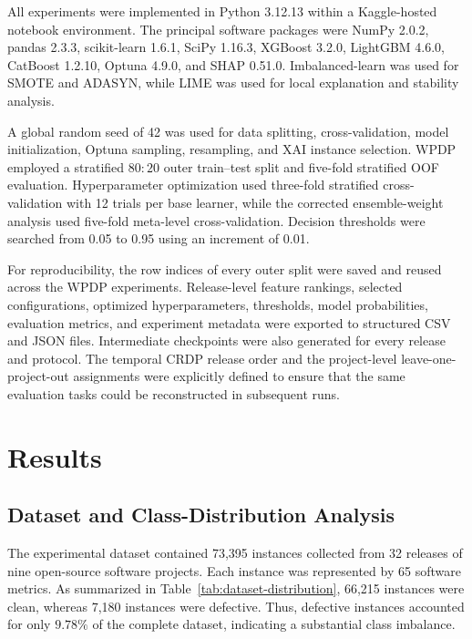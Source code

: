 \documentclass[conference]{IEEEtran}
\begin{document}
All experiments were implemented in Python 3.12.13 within a
Kaggle-hosted notebook environment. The principal software packages
were NumPy 2.0.2, pandas 2.3.3, scikit-learn 1.6.1, SciPy 1.16.3,
XGBoost 3.2.0, LightGBM 4.6.0, CatBoost 1.2.10, Optuna 4.9.0, and SHAP
0.51.0. Imbalanced-learn was used for SMOTE and ADASYN, while LIME was
used for local explanation and stability analysis.

A global random seed of 42 was used for data splitting,
cross-validation, model initialization, Optuna sampling, resampling,
and XAI instance selection. WPDP employed a stratified \(80{:}20\)
outer train--test split and five-fold stratified OOF evaluation.
Hyperparameter optimization used three-fold stratified
cross-validation with 12 trials per base learner, while the corrected
ensemble-weight analysis used five-fold meta-level cross-validation.
Decision thresholds were searched from 0.05 to 0.95 using an increment
of 0.01.

For reproducibility, the row indices of every outer split were saved and
reused across the WPDP experiments. Release-level feature rankings,
selected configurations, optimized hyperparameters, thresholds, model
probabilities, evaluation metrics, and experiment metadata were
exported to structured CSV and JSON files. Intermediate checkpoints
were also generated for every release and protocol. The temporal CRDP
release order and the project-level leave-one-project-out assignments
were explicitly defined to ensure that the same evaluation tasks could
be reconstructed in subsequent runs.

\section{Results}

\subsection{Dataset and Class-Distribution Analysis}
\label{subsec:dataset-class-distribution}

The experimental dataset contained 73,395 instances collected from
32 releases of nine open-source software projects. Each instance was
represented by 65 software metrics. As summarized in
Table~\ref{tab:dataset-distribution}, 66,215 instances were clean,
whereas 7,180 instances were defective. Thus, defective instances
accounted for only \(9.78\%\) of the complete dataset, indicating a
substantial class imbalance.
\end{document}

